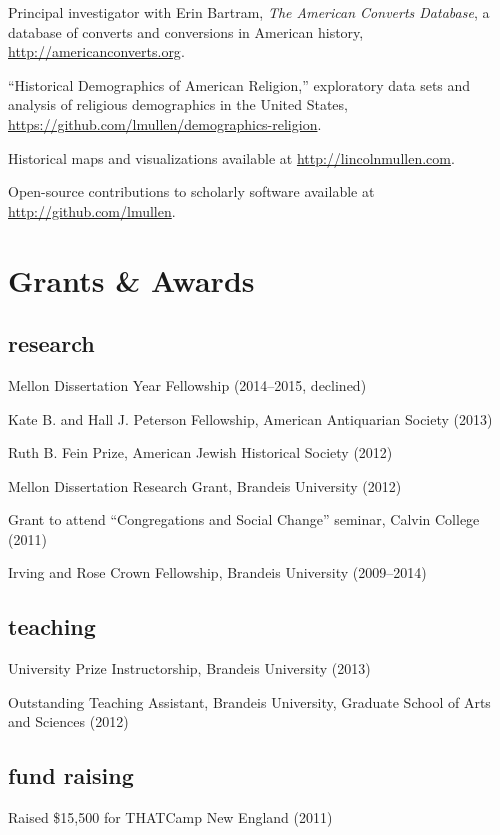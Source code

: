 \documentclass[11pt]{article}
\begin{document}
  Principal investigator with Erin Bartram, \emph{The American Converts 
    Database}, a database of converts and conversions in American history, 
  \url{http://americanconverts.org}.

  ``Historical Demographics of American Religion,'' exploratory data sets and 
  analysis of religious demographics in the United States,  
  \url{https://github.com/lmullen/demographics-religion}.

  Historical maps and visualizations available at 
  \url{http://lincolnmullen.com}.

  Open-source contributions to scholarly software available at 
  \url{http://github.com/lmullen}.

  \section{Grants \& Awards}

  \subsection{research}

  Mellon Dissertation Year Fellowship (2014--2015, declined)

  Kate B. and Hall J. Peterson Fellowship, American Antiquarian Society (2013)

  Ruth B. Fein Prize, American Jewish Historical Society (2012)

  Mellon Dissertation Research Grant, Brandeis University (2012)

  Grant to attend ``Congregations and Social Change'' seminar, Calvin 
  College (2011)

  Irving and Rose Crown Fellowship, Brandeis University (2009--2014)

  \subsection{teaching}

  University Prize Instructorship, Brandeis University (2013)

  Outstanding Teaching Assistant, Brandeis University, Graduate School of 
  Arts and Sciences (2012)

  \subsection{fund raising}

  Raised \$15,500 for THATCamp New England (2011)
\end{document}
